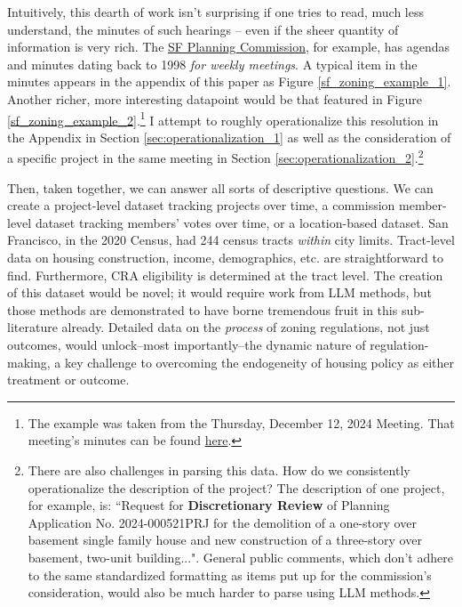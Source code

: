 \documentclass{article}[11pt]
\begin{document}
Intuitively, this dearth of work isn't surprising if one tries to read, much less understand, the minutes of such hearings -- even if the sheer quantity of information is very rich. The \href{https://sfplanning.org/cpc-hearing-archives}{SF Planning Commission}, for example, has agendas and minutes dating back to 1998 \textit{for weekly meetings}. A typical item in the minutes appears in the appendix of this paper as Figure \ref{sf_zoning_example_1}. Another richer, more interesting datapoint would be that featured in Figure \ref{sf_zoning_example_2}.\footnote{The example was taken from the Thursday, December 12, 2024 Meeting. That meeting's minutes can be found \href{https://citypln-m-extnl.sfgov.org/Commissions/Agenda_or_Minutes/20241212_cpc_min.pdf}{here}.} I attempt to roughly operationalize this resolution in the Appendix in Section \ref{sec:operationalization_1} as well as the consideration of a specific project in the same meeting in Section 
\ref{sec:operationalization_2}.\footnote{There are also challenges in parsing this data. How do we consistently operationalize the description of the project? The description of one project, for example, is: ``Request for \textbf{Discretionary Review} of Planning Application No. 2024-000521PRJ for the demolition of a one-story over basement single family house and new construction of a three-story over basement, two-unit building...". General public comments, which don't adhere to the same standardized formatting as items put up for the commission's consideration, would also be much harder to parse using LLM methods.}

Then, taken together, we can answer all sorts of descriptive questions. We can create a project-level dataset tracking projects over time, a commission member-level dataset tracking members' votes over time, or a location-based dataset. San Francisco, in the 2020 Census, had 244 census tracts \textit{within} city limits. Tract-level data on housing construction, income, demographics, etc. are straightforward to find. Furthermore, CRA eligibility is determined at the tract level. The creation of this dataset would be novel; it would require work from LLM methods, but those methods are demonstrated to have borne tremendous fruit in this sub-literature already. Detailed data on the \textit{process} of zoning regulations, not just outcomes, would unlock--most importantly--the dynamic nature of regulation-making, a key challenge to overcoming the endogeneity of housing policy as either treatment or outcome.
\end{document}
